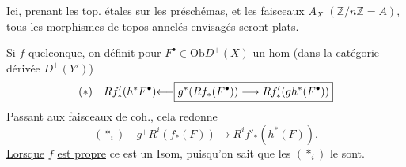 Ici, prenant les top. étales sur les préschémas, et les faisceaux
 $A_X$ $(\mathbb Z/n\mathbb Z=A)$,
tous les morphismes de topos annelés envisagés seront plats.


Si $f$ quelconque, on définit pour $F^\bullet\in\mathrm{Ob}D^+(X)$
un hom (dans la catégorie dérivée $D^+(Y')$)
\[
(*)\quad {Rf'_*(h^*F^\bullet)}
{\longleftarrow}
\boxed{g^*(Rf_*(F^\bullet))\longrightarrow Rf'_*({{g}}h^*(F^\bullet))}
\]
Passant aux faisceaux de coh., cela redonne
\[
(*_i)\quad g^+R^i(f_*(F))\longrightarrow R^if'_*(h^*(F)).
\]
\uline{Lorsque} $f$ \uline{est propre} ce est un Isom,
puisqu'on sait que les $(*_i)$ le sont.
